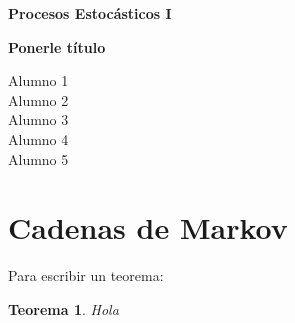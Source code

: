 \documentclass[
letterpaper,
11pt, %
oneside,
onecolumn, %
article
]{memoir}
\theoremstyle{plain}
\newtheorem{theorem}{Teorema}
\theoremstyle{definition}
\theoremstyle{remark}
\begin{document}

\begin{titlingpage} %

    \raggedleft %
	
	\vspace*{\baselineskip} %
	
	\vspace*{0.25\textheight} %
	
	
    \textbf{\huge Procesos Estocásticos I}\\[\baselineskip] %
    
    \vspace*{0.1\textheight}

    {\Huge{\textbf{Ponerle título}}}\\[\baselineskip] %
    \vspace*{0.1\textheight}

    
    {\Large Alumno 1}\\[\baselineskip]
    {\Large Alumno 2}\\[\baselineskip]
    {\Large Alumno 3}\\[\baselineskip]
    {\Large Alumno 4}\\[\baselineskip]
    {\Large Alumno 5}\\[\baselineskip]
	
	\vfill

\end{titlingpage}

\thispagestyle{empty}

\chapter*{Cadenas de Markov} %


\noindent \lipsum[1-9]

Para escribir un teorema:

\begin{theorem}
    Hola
\end{theorem}
\end{document}
